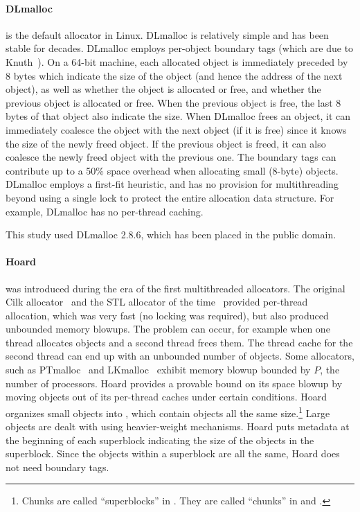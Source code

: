 \documentclass[natbib,sort&compress,10pt]{sigplanconf}
\begin{document}
{\paragraph{DLmalloc}} \cite{Lea96} is the default allocator in Linux.
DLmalloc is relatively simple and has been stable for decades.
DLmalloc employs per-object boundary tags (which are due to
Knuth~\cite{Knuth73}).  On a 64-bit machine, each allocated object is
immediately preceded by 8 bytes which indicate the size of the object
(and hence the address of the next object), as well as whether the
object is allocated or free, and whether the previous object is
allocated or free.  When the previous object is free, the last 8 bytes
of that object also indicate the size.  When DLmalloc frees an object,
it can immediately coalesce the object with the next object (if it is
free) since it knows the size of the newly freed object.  If the
previous object is freed, it can also coalesce the newly freed object
with the previous one.  The boundary tags can contribute up to a 50\%
space overhead when allocating small (8-byte) objects.  DLmalloc
employs a first-fit heuristic, and has no provision for multithreading
beyond using a single lock to protect the entire allocation data
structure.  For example, DLmalloc has no per-thread caching.

This study used DLmalloc 2.8.6, which has been placed in the public domain.

{\paragraph{Hoard}} \cite{BergerMcBl00} was introduced during the era
of the first multithreaded allocators.  The original Cilk
allocator~\cite{BlumofeLe94} and the STL allocator of the
time~\cite{SGI97} provided per-thread allocation, which was very fast
(no locking was required), but also produced unbounded memory blowups.
The problem can occur, for example when one thread allocates objects
and a second thread frees them.  The thread cache for the second
thread can end up with an unbounded number of objects.  Some
allocators, such as PTmalloc~\cite{Gloger06} and
LKmalloc~\cite{LarsonKr98} exhibit memory blowup bounded by $P$, the
number of processors.  Hoard provides a provable bound on its space
blowup by moving objects out of its per-thread caches under certain
conditions.  Hoard organizes small objects into , which
contain objects all the same size.\footnote{Chunks are called
  ``superblocks'' in \cite{BergerMcBl00}.  They are called ``chunks''
  in \cite{Evans06} and \cite{KukanovVo07}.}  Large objects are dealt
with using heavier-weight mechanisms.  Hoard puts metadata at the
beginning of each superblock indicating the size of the objects in the
superblock.  Since the objects within a superblock are all the same,
Hoard does not need boundary tags.
\end{document}
